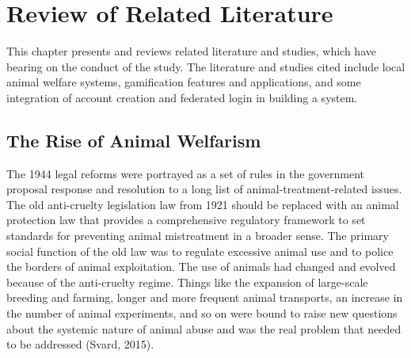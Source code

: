 \chapter{Review of Related Literature}
\label{sec:relatedlit}
This chapter presents and reviews related literature and studies, which have bearing on the conduct of the study. The literature and studies cited include local animal welfare systems, gamification features and applications, and some integration of account creation and federated login in building a system. 

\begin{comment}
%
%
Guide on Writing your RRL chapter
 
1. Identify the keywords with respect to your research
      One keyword = One document section
                Examples: 2.1 Story Generation Systems
			 2.2 Knowledge Representation

2.  Find references using these keywords

3.  For each of the references that you find,
        Check: Is it relevant to your research?
        Use their references to find more relevant works.

4. Identify a set of criteria for comparison.
       It will serve as a guide to help you focus on what to look for

5. Write a summary focusing on -
       What: A short description of the work
       How: A summary of the approach it utilized
       Findings: If applicable, provide the results
        Why: Relevance to your work

6. At the end of each section,  show a Table of Comparison of the related works 
   and your proposed project/system

\end{comment}

%
%

\section{The Rise of Animal Welfarism}

The 1944 legal reforms were portrayed as a set of rules in the government
proposal response and resolution to a long list of animal-treatment-related issues.
The old anti-cruelty legislation law from 1921 should be replaced with an animal
protection law that provides a comprehensive regulatory framework to set standards
for preventing animal mistreatment in a broader sense. The primary social
function of the old law was to regulate excessive animal use and to police the
borders of animal exploitation. The use of animals had changed and evolved because
of the anti-cruelty regime. Things like the expansion of large-scale breeding
and farming, longer and more frequent animal transports, an increase in the number
of animal experiments, and so on were bound to raise new questions about
the systemic nature of animal abuse and was the real problem that needed to be
addressed (Svard, 2015).

